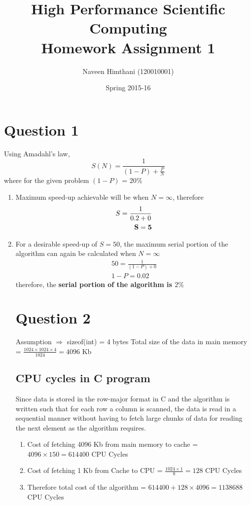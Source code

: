 \documentclass{article}
\title{High Performance Scientific Computing \\ Homework Assignment 1}
\author{Naveen Himthani (120010001)}
\date{Spring 2015-16}
\begin{document}
\maketitle

\section{Question 1}
Using Amadahl's law,
\begin{equation}
S(N) = \frac{1}{(1-P) + \frac{P}{N}}
\end{equation}
where for the given problem $(1-P)$ = 20$\%$ \\

\begin{enumerate}
\item Maximum speed-up achievable will be when $N=\infty$, therefore  \\
\begin{align}
S = \frac{1}{0.2 + 0} \\
\bf{S = 5}
\end{align}
\item For a desirable speed-up of $S=50$, the maximum serial portion of the algorithm can again be calculated when $N=\infty$ \\
\begin{align}
50 = \frac{1}{(1-P) + 0} \\
1-P = 0.02
\end{align}
therefore, the \textbf{serial portion of the algorithm is \bf{$2\%$}}

\section{Question 2}
Assumption $\Rightarrow$ sizeof(int) = 4 bytes
Total size of the data in main memory = $\frac{1024\times1024\times4}{1024} =  4096$ Kb
\subsection{CPU cycles in C program}
Since data is stored in the row-major format in C and the algorithm is written such that for each row a column is scanned, the data is read in a sequential manner without having to fetch large chunks of data for reading the next element as the algorithm requires.  
\begin{enumerate}
\item Cost of fetching 4096 Kb from main memory to cache = $4096\times150 = 614400$ CPU Cycles
\item Cost of fetching 1 Kb from Cache to CPU = $\frac{1024\times1}{8} = 128$ CPU Cycles
\item Therefore total cost of the algorithm = $614400+ 128\times4096 = 1138688$ CPU Cycles 
\end{enumerate}


\end{enumerate}
\end{document}
